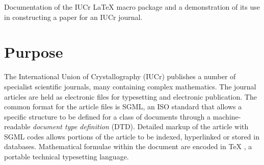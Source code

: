 \documentclass{iucr}              %
\begin{document}

\maketitle                        %

\begin{synopsis}
Documentation of the IUCr \LaTeX{} macro package and a demonstration of its
use in constructing a paper for an IUCr journal.
\end{synopsis}

\begin{abstract}
This document describes how to obtain and use the \emph{iucr} \LaTeX{} macro
package for submitting articles in \LaTeX{}2$\varepsilon$ format to IUCr
journals (\emph{Acta Crystallographica, Journal of Applied Crystallography,
Journal of Synchrotron Radiation}).
\end{abstract}




\section{Purpose}

The International Union of Crystallography (IUCr) publishes a number of
specialist scientific journals, many containing complex mathematics. The
journal articles are held as electronic files for typesetting and electronic
publication. The common format for the article files is SGML, an ISO standard
that allows a specific structure to be defined for a class of documents
through a machine-readable \emph{document type definition} (DTD). Detailed
markup of the article with SGML codes allows portions of the article to be
indexed, hyperlinked or stored in databases. Mathematical formulae within the
document are encoded in \TeX{} \cite{knuth84}, a portable technical
typesetting language.
\end{document}
